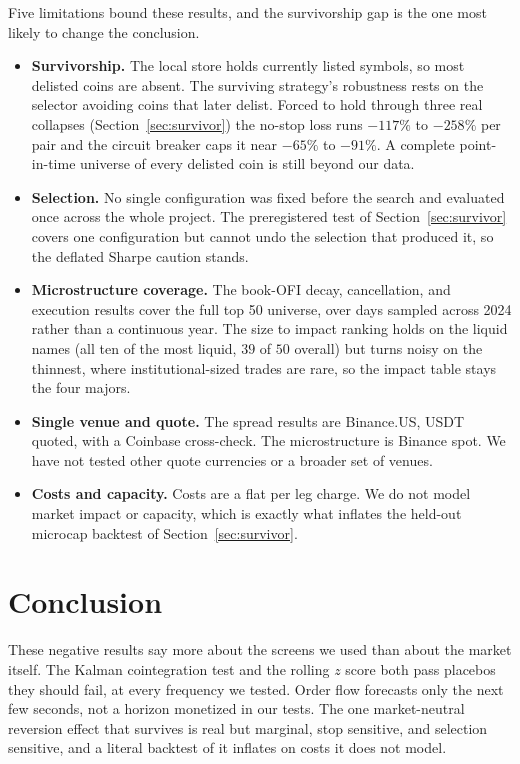 \documentclass[11pt]{article}
\begin{document}
Five limitations bound these results, and the survivorship gap is the one most likely to change
the conclusion.

\begin{itemize}
\item \textbf{Survivorship.} The local store holds currently listed symbols, so most delisted
coins are absent. The surviving strategy's robustness rests on the selector avoiding coins that
later delist. Forced to hold through three real collapses (Section~\ref{sec:survivor}) the no-stop
loss runs $-117\%$ to $-258\%$ per pair and the circuit breaker caps it near $-65\%$ to $-91\%$. A
complete point-in-time universe of every delisted coin is still beyond our data.
\item \textbf{Selection.} No single configuration was fixed before the search and evaluated once
across the whole project. The preregistered test of Section~\ref{sec:survivor} covers one
configuration but cannot undo the selection that produced it, so the deflated Sharpe caution
stands.
\item \textbf{Microstructure coverage.} The book-OFI decay, cancellation, and execution results cover the full top 50 universe, over
days sampled across 2024 rather than a continuous year. The size to impact ranking holds on the
liquid names (all ten of the most liquid, $39$ of $50$ overall) but turns noisy on the thinnest,
where institutional-sized trades are rare, so the impact table stays the four majors.
\item \textbf{Single venue and quote.} The spread results are Binance.US, USDT quoted, with a
Coinbase cross-check. The microstructure is Binance spot. We have not tested other quote
currencies or a broader set of venues.
\item \textbf{Costs and capacity.} Costs are a flat per leg charge. We do not model market impact
or capacity, which is exactly what inflates the held-out microcap backtest of
Section~\ref{sec:survivor}.
\end{itemize}

\section{Conclusion}
\label{sec:conclusion}

These negative results say more about the screens we used than about the market itself. The Kalman cointegration test and the rolling
$z$ score both pass placebos they should fail, at every frequency we tested. Order flow forecasts
only the next few seconds, not a horizon monetized in our tests. The one market-neutral reversion effect
that survives is real but marginal, stop sensitive, and selection sensitive, and a literal
backtest of it inflates on costs it does not model.
\end{document}
